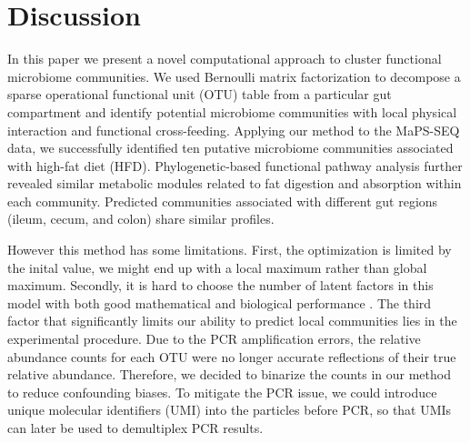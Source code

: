 \documentclass{bioinfo}
\begin{document}
\section{Discussion}

In this paper we present a novel computational approach to cluster functional microbiome communities. We used Bernoulli matrix factorization to decompose a sparse operational functional unit (OTU) table from a particular gut compartment and identify potential microbiome communities with local physical interaction and functional cross-feeding. Applying our method to the MaPS-SEQ data, we successfully identified ten putative microbiome communities associated with high-fat diet (HFD). Phylogenetic-based functional pathway analysis further revealed similar metabolic modules related to fat digestion and absorption within each community. Predicted communities associated with different gut regions (ileum, cecum, and colon) share similar profiles. 

However this method has some limitations. First, the optimization is limited by the inital value, we might end up with a local maximum rather than global maximum. Secondly, it is hard to choose the number of latent factors in this model with both good mathematical and biological performance . The third factor that significantly limits our ability to predict local communities lies in the experimental procedure. Due to the PCR amplification errors, the relative abundance counts for each OTU were no longer accurate reflections of their true relative abundance. Therefore, we decided to binarize the counts in our method to reduce confounding biases. To mitigate the PCR issue, we could introduce unique molecular identifiers (UMI) into the particles before PCR, so that UMIs can later be used to demultiplex PCR results.
\end{document}
